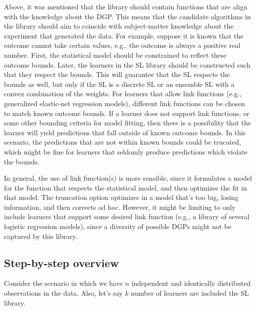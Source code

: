 \documentclass[12pt, krantz2,]{krantz}
\theoremstyle{definition}
\theoremstyle{definition}
\theoremstyle{definition}
\newcommand{\1}{\mathbbm{1}}
\begin{document}
\begin{shortbox}
Above, it was mentioned that the library should contain functions that are  
align with the knowledge about the DGP. This means that the candidate algorithms 
in the library should aim to coincide with subject-matter knowledge about the 
experiment that generated the data. For example, suppose it is known that the 
outcome cannot take certain values, e.g., the outcome is always a positive 
real number. First, the statistical model should be constrained to reflect these 
outcome bounds. Later, the learners in the SL library should be constructed such 
that they respect the bounds. This will guarantee that the SL respects the 
bounds as well, but only if the SL is a discrete SL or an ensemble SL with a 
convex combination of the weights. For learners that allow link functions 
(e.g., generalized elastic-net regression models), different link functions can 
be chosen to match known outcome bounds. If a learner does not support link 
functions, or some other bounding criteria for model fitting, then there is a 
possibility that the learner will yield predictions that fall outside of known 
outcome bounds. In this scenario, the predictions that are not within known 
bounds could be trucated, which might be fine for learners that seldomly produce 
predictions which violate the bounds. 

In general, the use of link function(s) is more sensible, since it formulates a 
model for the function that respects the statistical model, and then optimizes 
the fit in that model. The truncation option optimizes in a model that's too 
big, losing information, and then corrects ad hoc. However, it might be 
limiting to only include learners that support some desired link function 
(e.g., a library of several logistic regression models), since a diversity of 
possible DGPs might not be captured by this library. 
\end{shortbox}

\hypertarget{step-by-step-overview}{%
\subsection{Step-by-step overview}\label{step-by-step-overview}}

Consider the scenario in which we have \(n\) independent and identically
distributed observations in the data. Also, let's say \(k\) number of learners
are included the SL library.
\end{document}
